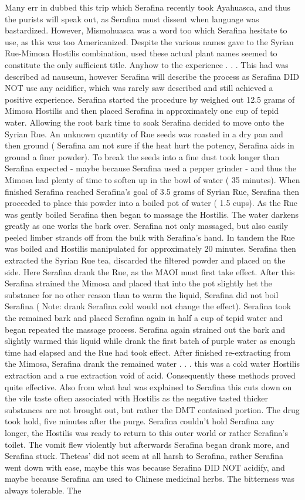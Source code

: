 \documentclass[12pt]{book}
\begin{document}
Many err in dubbed this trip which Serafina recently took Ayahuasca, and thus the purists will speak out, as Serafina must dissent when language was bastardized. However, Mismohuasca was a word too which Serafina hesitate to use, as this was too Americanized. Despite the various names gave to the Syrian Rue-Mimosa Hostilis combination, used these actual plant names seemed to constitute the only sufficient title. Anyhow to the experience . . .  This had was described ad nauseum, however Serafina will describe the process as Serafina DID NOT use any acidifier, which was rarely saw described and still achieved a positive experience. Serafina started the procedure by weighed out 12.5 grams of Mimosa Hostilis and then placed Serafina in approximately one cup of tepid water. Allowing the root bark time to soak Serafina decided to move onto the Syrian Rue. An unknown quantity of Rue seeds was roasted in a dry pan and then ground ( Serafina am not sure if the heat hurt the potency, Serafina aids in ground a finer powder). To break the seeds into a fine dust took longer than Serafina expected - maybe because Serafina used a pepper grinder - and thus the Mimosa had plenty of time to soften up in the bowl of water ( 35 minutes). When finished Serafina reached Serafina's goal of 3.5 grams of Syrian Rue, Serafina then proceeded to place this powder into a boiled pot of water ( 1.5 cups). As the Rue was gently boiled Serafina then began to massage the Hostilis. The water darkens greatly as one works the bark over. Serafina not only massaged, but also easily peeled limber strands off from the bulk with Serafina's hand. In tandem the Rue was boiled and Hostilis manipulated for approximately 20 minutes. Serafina then extracted the Syrian Rue tea, discarded the filtered powder and placed on the side. Here Serafina drank the Rue, as the MAOI must first take effect. After this Serafina strained the Mimosa and placed that into the pot slightly het the substance for no other reason than to warm the liquid, Serafina did not boil Serafina ( Note: drank Serafina cold would not change the effect). Serafina took the remained bark and placed Serafina again in half a cup of tepid water and began repeated the massage process. Serafina again strained out the bark and slightly warmed this liquid while drank the first batch of purple water as enough time had elapsed and the Rue had took effect. After finished re-extracting from the Mimosa, Serafina drank the remained water . . .  this was a cold water Hostilis extraction and a rue extraction void of acid. Consequently these methods proved quite effective. Also from what had was explained to Serafina this cuts down on the vile taste often associated with Hostilis as the negative tasted thicker substances are not brought out, but rather the DMT contained portion. The drug took hold, five minutes after the purge. Serafina couldn't hold Serafina any longer, the Hostilis was ready to return to this outer world or rather Serafina's toilet. The vomit flew violently but afterwards Serafina began drank more, and Serafina stuck. Theteas' did not seem at all harsh to Serafina, rather Serafina went down with ease, maybe this was because Serafina DID NOT acidify, and maybe because Serafina am used to Chinese medicinal herbs. The bitterness was always tolerable. The 
\end{document}
